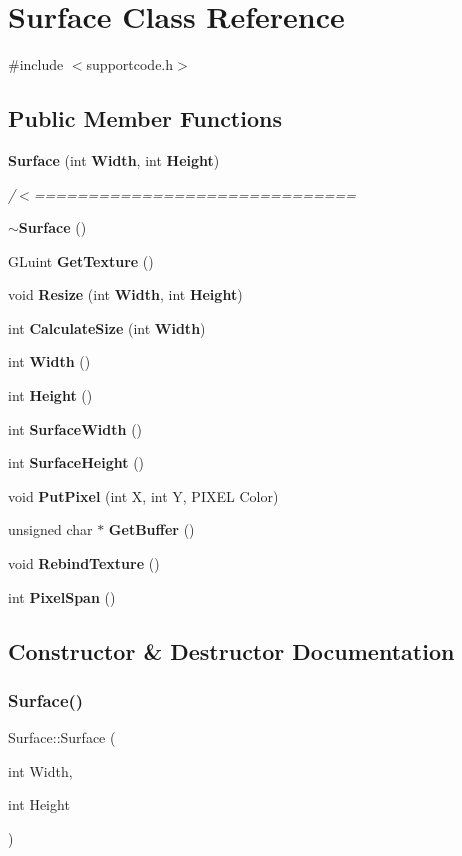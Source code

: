 \section{Surface Class Reference}
\label{class_surface}


{\ttfamily \#include $<$supportcode.\+h$>$}

\subsection*{Public Member Functions}
\begin{DoxyCompactItemize}
\item 
\textbf{ Surface} (int \textbf{ Width}, int \textbf{ Height})
\begin{DoxyCompactList}\small\item\em /$<$============================== \end{DoxyCompactList}\item 
\textbf{ $\sim$\+Surface} ()
\item 
G\+Luint \textbf{ Get\+Texture} ()
\item 
void \textbf{ Resize} (int \textbf{ Width}, int \textbf{ Height})
\item 
int \textbf{ Calculate\+Size} (int \textbf{ Width})
\item 
int \textbf{ Width} ()
\item 
int \textbf{ Height} ()
\item 
int \textbf{ Surface\+Width} ()
\item 
int \textbf{ Surface\+Height} ()
\item 
void \textbf{ Put\+Pixel} (int X, int Y, P\+I\+X\+EL Color)
\item 
unsigned char $\ast$ \textbf{ Get\+Buffer} ()
\item 
void \textbf{ Rebind\+Texture} ()
\item 
int \textbf{ Pixel\+Span} ()
\end{DoxyCompactItemize}


\subsection{Constructor \& Destructor Documentation}
\mbox{\label{class_surface_a323ba9165c8635e84eb0c490fe88d846}} 
\subsubsection{Surface()}
{\footnotesize\ttfamily Surface\+::\+Surface (\begin{DoxyParamCaption}\item[{int}]{Width,  }\item[{int}]{Height }\end{DoxyParamCaption})}




